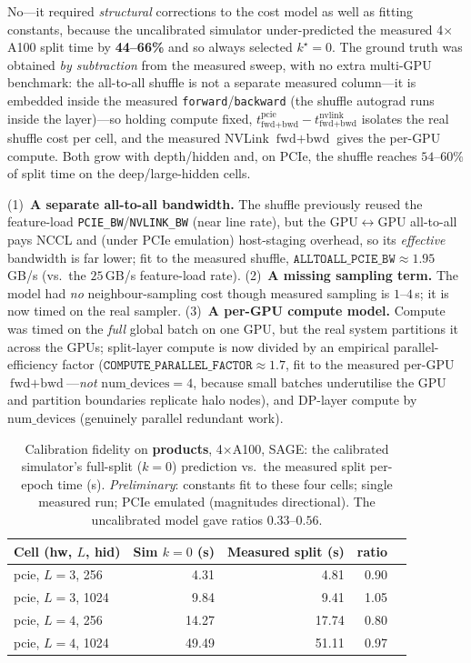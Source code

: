 No---it required \emph{structural} corrections to the cost model as well as fitting
constants, because the uncalibrated simulator under-predicted the measured 4$\times$A100
split time by \textbf{44--66\%} and so always selected $k^\star{=}0$. The ground truth was
obtained \emph{by subtraction} from the measured sweep, with no extra multi-GPU benchmark:
the all-to-all shuffle is not a separate measured column---it is embedded inside the
measured \texttt{forward}/\texttt{backward} (the shuffle autograd runs inside the layer)---so
holding compute fixed, $t^{\text{pcie}}_{\text{fwd+bwd}}-t^{\text{nvlink}}_{\text{fwd+bwd}}$
isolates the real shuffle cost per cell, and the measured NVLink $\text{fwd}{+}\text{bwd}$
gives the per-GPU compute. Both grow with depth/hidden and, on PCIe, the shuffle reaches
$54$--$60\%$ of split time on the deep/large-hidden cells.

(1)~\textbf{A separate all-to-all bandwidth.} The shuffle previously reused the feature-load
\texttt{PCIE\_BW}/\texttt{NVLINK\_BW} (near line rate), but the GPU$\leftrightarrow$GPU
all-to-all pays NCCL and (under PCIe emulation) host-staging overhead, so its \emph{effective}
bandwidth is far lower; fit to the measured shuffle, $\texttt{ALLTOALL\_PCIE\_BW}{\approx}1.95$\,GB/s
(vs.\ the $25$\,GB/s feature-load rate). (2)~\textbf{A missing sampling term.} The model had
\emph{no} neighbour-sampling cost though measured sampling is $1$--$4$\,s; it is now timed on
the real sampler. (3)~\textbf{A per-GPU compute model.} Compute was timed on the \emph{full}
global batch on one GPU, but the real system partitions it across the GPUs; split-layer
compute is now divided by an empirical parallel-efficiency factor
($\texttt{COMPUTE\_PARALLEL\_FACTOR}{\approx}1.7$, fit to the measured per-GPU
$\text{fwd}{+}\text{bwd}$---\emph{not} $\text{num\_devices}{=}4$, because small batches
underutilise the GPU and partition boundaries replicate halo nodes), and DP-layer compute by
$\text{num\_devices}$ (genuinely parallel redundant work).

\begin{table}[h]
\centering
\caption{Calibration fidelity on \textbf{products}, 4$\times$A100, SAGE: the calibrated
simulator's full-split ($k{=}0$) prediction vs.\ the measured split per-epoch time (s).
\emph{Preliminary}: constants fit to these four cells; single measured run; PCIe emulated
(magnitudes directional). The uncalibrated model gave ratios $0.33$--$0.56$.}
\label{tab:sim-calib-products}
\begin{tabular}{l r r r r}
\toprule
Cell (hw, $L$, hid) & Sim $k{=}0$ (s) & Measured split (s) & ratio \\
\midrule
pcie, $L{=}3$, 256  & 4.31  & 4.81  & 0.90 \\
pcie, $L{=}3$, 1024 & 9.84  & 9.41  & 1.05 \\
pcie, $L{=}4$, 256  & 14.27 & 17.74 & 0.80 \\
pcie, $L{=}4$, 1024 & 49.49 & 51.11 & 0.97 \\
\bottomrule
\end{tabular}
\end{table}

